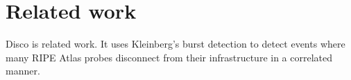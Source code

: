 
\section{Related work}
\label{sec:related}

Disco is related work. It uses Kleinberg's burst detection to detect
events where many RIPE Atlas probes disconnect from
their infrastructure in a correlated manner.